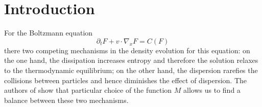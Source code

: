 

\section{Introduction} %
\label{sec:introduction}
For the Boltzmann equation 
\[\partial_t F + v\cdot \nabla_x F = C(F)\]
there two competing mechanisms in the density evolution for this equation: on the one hand, the dissipation increases entropy and therefore the solution relaxes to the thermodynamic equilibrium; on the other hand, the dispersion rarefies the collisions between particles and hence diminishes the effect of dispersion. The authors of \cite{FG} show that particular choice of the function $M$ allows us to find a balance between these two mechanisms.

